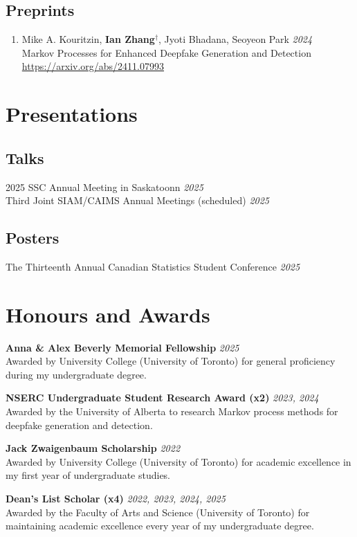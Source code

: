 \documentclass[11pt]{article}
\theoremstyle{definition}
\newcommand{\1}{\mathds 1}
\begin{document}
\subsection*{Preprints}
\begin{enumerate}
    \item Mike A. Kouritzin, \textbf{Ian Zhang}$^\dag$, Jyoti Bhadana, Seoyeon Park \hfill \textit{2024}\\
    Markov Processes for Enhanced Deepfake Generation and Detection \\
    \url{https://arxiv.org/abs/2411.07993}
\end{enumerate}

\section*{Presentations}
\subsection*{Talks}
2025 SSC Annual Meeting in Saskatoonn \hfill \textit{2025}\\
Third Joint SIAM/CAIMS Annual Meetings (scheduled) \hfill \textit{2025}

\subsection*{Posters}
The Thirteenth Annual Canadian Statistics Student Conference \hfill \textit{2025}

\section*{Honours and Awards}
\textbf{Anna \& Alex Beverly Memorial Fellowship} \hfill \textit{2025}\\
Awarded by University College (University of Toronto) for general proficiency during my undergraduate degree.

\textbf{NSERC Undergraduate Student Research Award (x2)} \hfill \textit{2023, 2024}\\
Awarded by the University of Alberta to research Markov process methods for deepfake generation and detection. 

\textbf{Jack Zwaigenbaum Scholarship }\hfill \textit{2022}\\
Awarded by University College (University of Toronto) for academic excellence in my first year of undergraduate studies.

\textbf{Dean's List Scholar (x4)} \hfill \textit{2022, 2023, 2024, 2025}\\
Awarded by the Faculty of Arts and Science (University of Toronto) for maintaining academic excellence every year of my undergraduate degree. 
\end{document}
